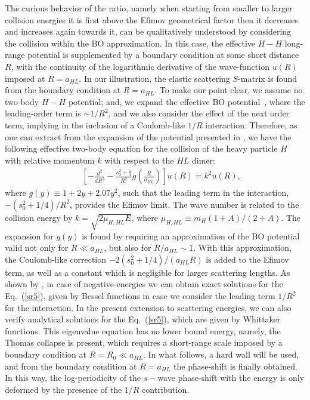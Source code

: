 \documentclass[twocolumn,amsmath,amssymb,epsfig,aps,prl]{revtex4}
\begin{document}
The curious behavior of the ratio,  namely when starting from smaller to 
larger collision energies it is first above  the Efimov geometrical factor then it decreases and increases again
towards it, can be qualitatively understood by considering the collision within the BO approximation. In this case,
the effective $H-H$ long-range potential is supplemented by a boundary condition at some short distance $R$, 
with the continuity of the logarithmic derivative of the wave-function $u(R)$ imposed at $R=a_{HL}$. 
In our illustration, the elastic scattering $S$-matrix is found from the boundary condition at $R=a_{HL}$.
To make our point clear, we assume no two-body $H-H$ potential; and, we expand the effective BO potential~\cite{1979fonseca}, 
where the leading-order term is $\sim 1/R^2$, and we also consider the effect of the next order term, 
implying in the inclusion of a Coulomb-like $1/R$ interaction.
Therefore, as one can extract from the expansion of the potential presented in \cite{1979fonseca}, 
we have the following effective two-body equation for the collision of the heavy particle $H$ with relative  momentum $k$ 
with respect to the $HL$ dimer:
\begin{eqnarray}
&&\left[-\frac{d^2}{dR^2} - \frac{s_0^2+\frac{1}{4}}{R^2}g\left(\frac{R}{a_{HL}}\right)
\right] u(R)= k^2 u(R), 
\label{sr5}
\end{eqnarray}
where $g(y) \equiv 1+2 y+2.07 y^2$, such that the leading term in the interaction,
$-\left({s_0^2+{1}/{4}}\right)/{R^2}$, provides the Efimov limit. The wave number is related to
the collision energy by $k=\sqrt{2 \mu_{H,HL}E}$, where 
$\mu_{H,HL}\equiv m_H (1+A)/(2+A)$.
The expansion for $g(y)$ is found  by requiring an approximation of the BO potential 
valid not only for $R\ll a_{HL}$, but also for $R/a_{HL}\sim 1$.
With this approximation, the Coulomb-like correction
$-2\left({s_0^2+{1}/{4}}\right)/{(a_{HL}R)}$ is added to the Efimov term, as well as a constant which is
negligible for larger scattering lengths.
As shown by \cite{1979fonseca}, in case of negative-energies we can obtain exact solutions 
for the Eq.~(\ref{sr5}), given by Bessel functions in case we consider the leading term $1/R^2$ 
for the interaction.  In the present extension to scattering energies, we can also verify analytical solutions 
for the Eq.~(\ref{sr5}), which are given by Whittaker functions.
This eigenvalue equation has no lower bound energy, namely, the Thomas collapse is present, 
which requires a short-range scale imposed by a boundary condition at $R=R_0\ll a_{HL}$. 
In what follows, a hard wall will be used, and from the boundary condition at $R=a_{HL}$ the phase-shift 
is finally obtained. In this way, the log-periodicity of the $s-$wave phase-shift with the 
energy is only deformed by the presence of the $1/R$ contribution.
\end{document}
